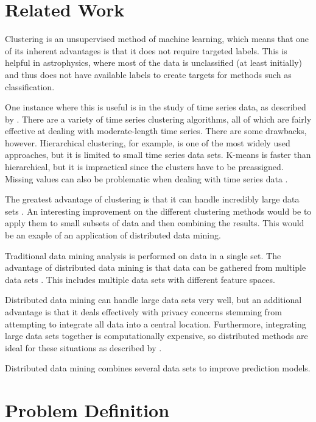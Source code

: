 \documentclass[12pt]{article}
\begin{document}

\section{Related Work} %
\label{sec:Related Work}
Clustering is an unsupervised method of machine learning, which means that one of its inherent advantages is that it does not require targeted labels.
This is helpful in astrophysics, where most of the data is unclassified (at least initially) and thus does not have available labels to create targets for methods such as classification.

One instance where this is useful is in the study of time series data, as described by \cite{wang}.
There are a variety of time series clustering algorithms, all of which are fairly effective at dealing with moderate-length time series.
There are some drawbacks, however.
Hierarchical clustering, for example, is one of the most widely used approaches, but it is limited to small time series data sets.
K-means is faster than hierarchical, but it is impractical since the clusters have to be preassigned.
Missing values can also be problematic when dealing with time series data \citep{wang}. 

The greatest advantage of clustering is that it can handle incredibly large data sets \citep{januzaj}.
An interesting improvement on the different clustering methods would be to apply them to small subsets of data and then combining the results. 
This would be an exaple of an application of distributed data mining.

Traditional data mining analysis is performed on data in a single set.
The advantage of distributed data mining is that data can be gathered from multiple data sets \citep{McConnell}.
This includes multiple data sets with different feature spaces.

Distributed data mining can handle large data sets very well, but an additional advantage is that it deals effectively with privacy concerns stemming from attempting to integrate all data into a central location. Furthermore, integrating large data sets together is computationally expensive, so distributed methods are ideal for these situations as described by \cite{McConnell2}. 

Distributed data mining combines several data sets to improve prediction models. 


\section{Problem Definition} %
\label{sec:Problem Definition}
\end{document}
